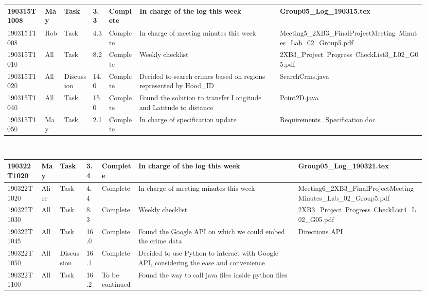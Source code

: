 \documentclass[10pt]{article}
\begin{document}
\begin{tabular}{|p{2cm}| p{1cm}| p{2cm}| p{1cm}| p{1.5cm}| p{4cm}| p{5cm}|}
 \hline 
     190315T1008& May & Task & 3.3 & Complete & In charge of the log this week &  Group05\_Log\_190315.tex\\
 \hline 
  190315T1008& Rob & Task & 4.3 & Complete & In charge of meeting minutes this week &Meeting5\_2XB3\_FinalProjectMeeting\
  Minutes\_Lab\_02\_Group5.pdf\\
  \hline 
     190315T1010& All & Task & 8.2 & Complete &  Weekly checklist & 2XB3\_Project\ Progress\ CheckList3\_L02\_G05.pdf\\
   \hline 
     190315T1020& All & Discussion & 14.0 & Complete &  Decided to search crimes based on regions represented by Hood\_ID & SearchCrms.java\\
  \hline 
   190315T1040&  All & Task & 15.0 & Complete & Found the solution to transfer Longitude and Latitude to distance& Point2D.java\\
 \hline 
  190315T1050&  May & Task & 2.1 & Complete & In charge of specification update & Requirements\_Specification.doc\\
 \hline
 \end{tabular}
 
 
 \newpage
  \ \\
  \begin{tabular}{|p{2cm}| p{1cm}| p{2cm}| p{1cm}| p{1.5cm}| p{4cm}| p{5cm}|} 
  \hline
 190322T1020&  May & Task & 3.4 & Complete & In charge of the log this week & Group05\_Log\_190321.tex\\
  \hline
 190322T1020&  Alice & Task & 4.4 & Complete & In charge of meeting minutes this week &Meeting6\_2XB3\_FinalProjectMeeting\
  Minutes\_Lab\_02\_Group5.pdf\\
 \hline
 190322T1030&  All & Task & 8.3 & Complete & Weekly checklist &2XB3\_Project\ Progress\ CheckList4\_L02\_G05.pdf\\
 \hline
 190322T1045&  All & Task & 16.0 & Complete & Found the Google API on which we could embed the crime data & Directions API\\
 \hline
 190322T1050&  All & Discussion & 16.1 & Complete & Decided to use Python to interact with Google API, considering the ease and convenience & \\
 \hline
  190322T1100& All & Task & 16.2 & To be continued & Found the way to call java files inside python files  & \\
 \hline
 
\end{tabular}
\end{document}
